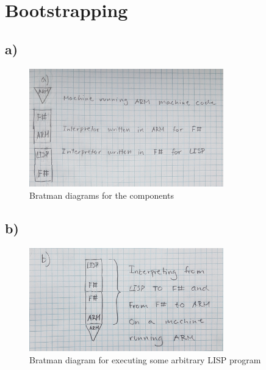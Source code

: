 \section{Bootstrapping}

\subsection{a)}
\begin{figure}[H]
    \centering
    \includegraphics[width=0.75\textwidth]{Figures/PLD_A1_Q3_A_cropped.jpg}
    \caption{Bratman diagrams for the components}
\end{figure}

\subsection{b)}

\begin{figure}[H]
    \centering
    \includegraphics[width=0.75\textwidth]{Figures/PLD_A1_Q3_B_cropped.jpg}
    \caption{Bratman diagram for executing some arbitrary LISP program}
\end{figure}